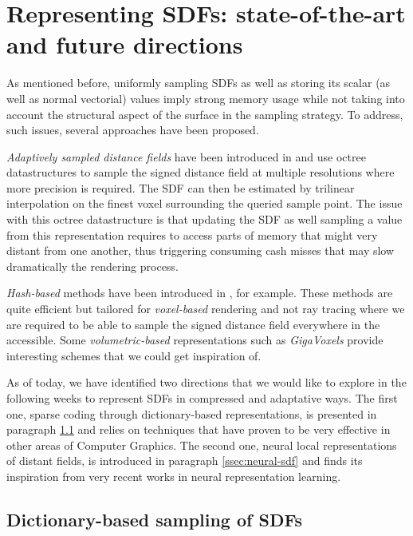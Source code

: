 \documentclass[10pt,a4paper,english, twocolumn]{article}
\begin{document}
\section{Representing SDFs: state-of-the-art and future directions}
\label{sec:representing-sdf}

As mentioned before, uniformly sampling SDFs as well as storing its scalar (as well as normal vectorial) values imply strong memory usage while not taking into account the structural aspect of the surface in the sampling strategy. To address, such issues, several approaches have been proposed.

\textit{Adaptively sampled distance fields} have been introduced in \cite{10.1145/344779.344899} and use octree datastructures to sample the signed distance field at multiple resolutions where more precision is required. The SDF can then be estimated by trilinear interpolation on the finest voxel surrounding the queried sample point. The issue with this octree datastructure is that updating the SDF as well sampling a value from this representation requires to access parts of memory that might very distant from one another, thus triggering consuming cash misses that may slow dramatically the rendering process.

\textit{Hash-based} methods have been introduced in \cite{10.1145/2508363.2508374}, for example. These methods are quite efficient but tailored for \textit{voxel-based} rendering and not ray tracing where we are required to be able to sample the signed distance field everywhere in the accessible. Some \textit{volumetric-based} representations such as \textit{GigaVoxels}\cite{crassin:inria-00345899} provide interesting schemes that we could get inspiration of.

As of today, we have identified two directions that we would like to explore in the following weeks to represent SDFs in compressed and adaptative ways. The first one, sparse coding through dictionary-based representations, is presented in paragraph \ref{ssec:dictionary-sdf} and relies on techniques that have proven to be very effective in other areas of Computer Graphics. The second one, neural local representations of distant fields, is introduced in paragraph \ref{ssec:neural-sdf} and finds its inspiration from very recent works in neural representation learning.

\subsection{Dictionary-based sampling of SDFs}
\label{ssec:dictionary-sdf}
\end{document}
